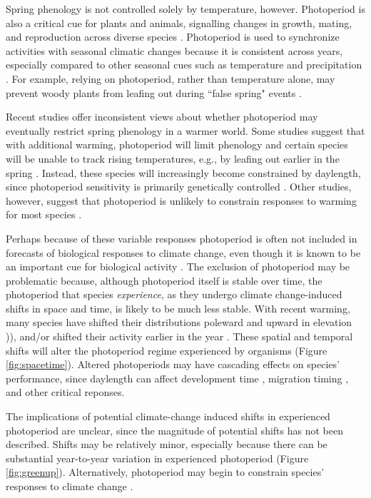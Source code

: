 \documentclass{article}
\begin{document}
\par Spring phenology is not controlled solely by temperature, however. Photoperiod is also a critical cue for plants and animals, signalling changes in growth, mating, and reproduction across diverse species \citep[e.g.,][]{Howe:1996,flynn2018,solbakken1994,mcallan2006,lagercrantz2009}. Photoperiod is used to synchronize activities with seasonal climatic changes \citep[e.g.,][]{hsu2011,Singh:2017,Basler:2012} because it is consistent across years, especially compared to other seasonal cues such as temperature and precipitation \citep{saikkonen2012}. For example, relying on photoperiod, rather than temperature alone, may prevent woody plants from leafing out during ``false spring" events \citep[unusually warm periods during winter that are followed by a return of cold temperatures][] {Gu2008}. 

\par Recent studies offer inconsistent views about whether photoperiod may eventually restrict spring phenology in a warmer world. Some studies suggest that with additional warming, photoperiod will limit phenology and certain species will be unable to track rising temperatures, e.g., by leafing out earlier in the spring \citep{koerner2010b,way2015}. Instead, these species will increasingly become constrained by daylength, since photoperiod sensitivity is primarily genetically controlled \citep{bradshaw2008}. Other studies, however, suggest that photoperiod is unlikely to constrain responses to warming for most species \citep{zohner2016,chuine2010}. 


\par Perhaps because of these variable responses photoperiod is often not included in forecasts of biological responses to climate change, even though it is known to be an important cue for biological activity \citep[but see ][]{duputie2015}. 
The exclusion of photoperiod may be problematic because, although photoperiod itself is stable over time, the photoperiod that species \emph{experience}, as they undergo climate change-induced shifts in space and time, is likely to be much less stable. With recent warming, many species have shifted their distributions poleward and upward in elevation \citep[i.e., range shifts][]{parmesan2006,chen2011,harsch2009,penuelas2003})), and/or shifted their activity earlier in the year \citep[i.e., phenological shifts][]{parmesan2006, wolkovich2012}. These spatial and temporal shifts will alter the photoperiod regime experienced by organisms (Figure \ref{fig:spacetime}). Altered photoperiods may have cascading effects on species' performance, since daylength can affect development time \citep{muir1994}, migration timing \citep{dawbin1966}, and other critical reponses. 
\par The implications of potential climate-change induced shifts in experienced photoperiod are unclear, since the magnitude of potential shifts has not been described. Shifts may be relatively minor, especially because there can be substantial year-to-year variation in experienced photoperiod (Figure \ref{fig:greenup}). Alternatively, photoperiod may begin to constrain species' responses to climate change \citep{koerner2010b}.
\end{document}
